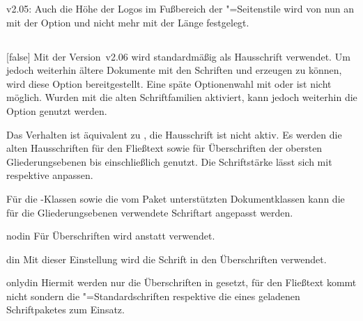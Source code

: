 \begin{Obsolete}{v2.05:}{}%
\printobsoletelist%
%
Auch die Höhe der Logos im Fußbereich der "=Seitenstile 
wird von nun an mit der Option  und nicht mehr mit der 
Länge  festgelegt.
\end{Obsolete}


\subsection{}
\begin{Declaration}[v2.06]{}[false]
\printdeclarationlist%
%
Mit der Version~v2.06 wird standardmäßig \OpenSans als Hausschrift verwendet. 
Um jedoch weiterhin ältere Dokumente mit den Schriften \Univers und \DIN 
erzeugen zu können, wird diese Option bereitgestellt.
 Eine späte Optionenwahl mit  oder  ist 
nicht möglich. Wurden mit  die alten Schriftfamilien 
aktiviert, kann jedoch weiterhin die Option  genutzt werden.
%
\begin{values}{}
\itemfalse
  Das Verhalten ist äquivalent zu , die Hausschrift ist 
  nicht aktiv.
\itemtrue*
  Es werden die alten Hausschriften \Univers für den Fließtext sowie \DIN für 
  Überschriften der obersten Gliederungsebenen bis einschließlich 
   genutzt. Die Schriftstärke lässt sich mit 
   respektive  anpassen.
\end{values}
%
Für die \TUDScript-Klassen sowie die vom Paket  
unterstützten Dokumentklassen kann die für die Gliederungsebenen verwendete 
Schriftart angepasst werden.
%
\begin{values}{}
\item[nodin]
  Für Überschriften wird \Univers anstatt \DIN verwendet.
\item[din]
  Mit dieser Einstellung wird die Schrift \DIN in den Überschriften verwendet. 
\item[onlydin]
  Hiermit werden nur die Überschriften in \DIN gesetzt, für den Fließtext kommt 
  nicht \Univers sondern die "=Standardschriften respektive die 
  eines geladenen Schriftpaketes zum Einsatz.
\end{values}
\end{Declaration}

